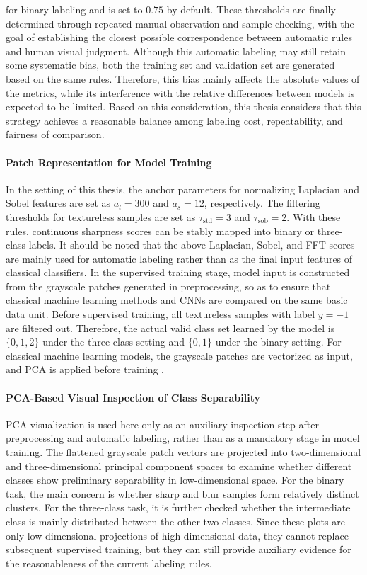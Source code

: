 for binary labeling and is set to $0.75$ by default. These thresholds are
finally determined through repeated manual observation and sample checking, with
the goal of establishing the closest possible correspondence between automatic
rules and human visual judgment. Although this automatic labeling may still
retain some systematic bias, both the training set and validation set are
generated based on the same rules. Therefore, this bias mainly affects the
absolute values of the metrics, while its interference with the relative
differences between models is expected to be limited. Based on this
consideration, this thesis considers that this strategy achieves a reasonable
balance among labeling cost, repeatability, and fairness of comparison.

\paragraph{Patch Representation for Model Training}
\par In the setting of this thesis, the anchor parameters for normalizing
Laplacian and Sobel features are set as $a_l=300$ and $a_s=12$, respectively.
The filtering thresholds for textureless samples are set as
$\tau_{\mathrm{std}}=3$ and $\tau_{\mathrm{sob}}=2$. With these rules,
continuous sharpness scores can be stably mapped into binary or three-class
labels. It should be noted that the above Laplacian, Sobel, and FFT scores are
mainly used for automatic labeling rather than as the final input features of
classical classifiers. In the supervised training stage, model input is
constructed from the grayscale patches generated in preprocessing, so as to
ensure that classical machine learning methods and CNNs are compared on the same
basic data unit. Before supervised training, all textureless samples with label
$y=-1$ are filtered out. Therefore, the actual valid class set learned by the
model is $\{0,1,2\}$ under the three-class setting and $\{0,1\}$ under the
binary setting. For classical machine learning models, the grayscale patches are
vectorized as input, and PCA is applied before training
\cite{zheng2021application}.

\paragraph{PCA-Based Visual Inspection of Class Separability}
\par PCA visualization is used here only as an auxiliary inspection step after
preprocessing and automatic labeling, rather than as a mandatory stage in model
training. The flattened grayscale patch vectors are projected into
two-dimensional and three-dimensional principal component spaces to examine
whether different classes show preliminary separability in low-dimensional
space. For the binary task, the main concern is whether sharp and blur samples
form relatively distinct clusters. For the three-class task, it is further
checked whether the intermediate class is mainly distributed between the other
two classes. Since these plots are only low-dimensional projections of
high-dimensional data, they cannot replace subsequent supervised training, but
they can still provide auxiliary evidence for the reasonableness of the current
labeling rules.

